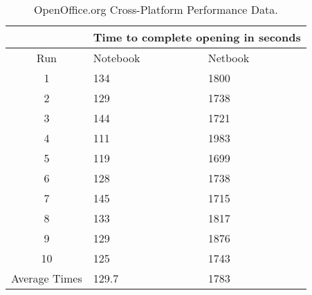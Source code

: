 \begin{table}
  \begin{center}
  \begin{tabularx}{300pt}{| c | X | X |}
    \hline
                      & \multicolumn{2}{c|}{Time to complete opening in seconds} \\ \hline
    Run               & Notebook & Netbook    \\ \hline
    1                 & 134      & 1800       \\ \hline
    2                 & 129      & 1738       \\ \hline
    3                 & 144      & 1721       \\ \hline
    4                 & 111      & 1983       \\ \hline
    5                 & 119      & 1699       \\ \hline
    6                 & 128      & 1738       \\ \hline
    7                 & 145      & 1715       \\ \hline
    8                 & 133      & 1817       \\ \hline
    9                 & 129      & 1876       \\ \hline
    10                & 125      & 1743       \\ \hline
    Average Times     & 129.7    & 1783       \\
    \hline
  \end{tabularx}
  \caption{OpenOffice.org Cross-Platform Performance Data.}
  \label{ooCp}
  \end{center}
\end{table}
